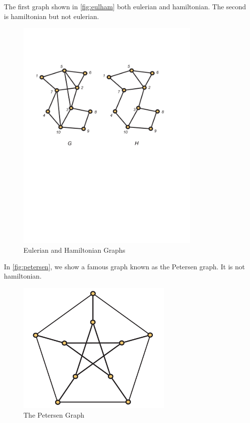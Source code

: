 The first graph shown in \autoref{fig:eulham} both eulerian and
hamiltonian.  The second is hamiltonian but not eulerian.
\begin{figure}
\begin{center}
\includegraphics*[viewport = 47 358 524 680, width=3.55in]{graphs-figs/eulerian_hamiltonian}
\caption{\label{fig:eulham}Eulerian and Hamiltonian Graphs}
\end{center}
\end{figure}

In \autoref{fig:petersen}, we show a famous graph known
as the Petersen graph. It is not hamiltonian.
\begin{figure}
\begin{center}
\includegraphics*[width=3in]{graphs-figs/petersen_graph}
\caption{\label{fig:petersen}The Petersen Graph}
\end{center}
\end{figure}


